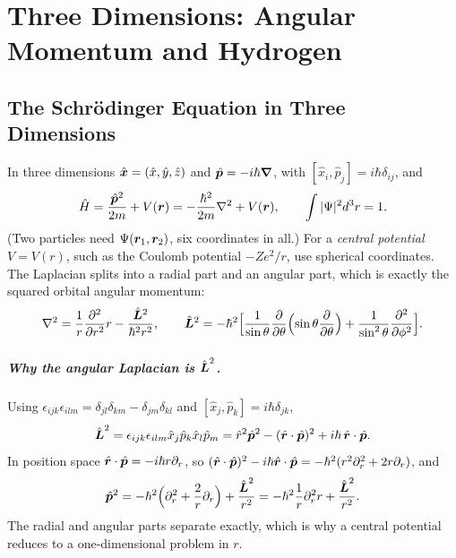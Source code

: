 \chapter{Three Dimensions: Angular Momentum and Hydrogen}
\label{ch:3d}

\section{The Schr\"odinger Equation in Three Dimensions}

In three dimensions $\hat{\bm{x}} = (\hat{x},\hat{y},\hat{z})$ and $\hat{\bm{p}} = -i\hbar\grad$, with $[\hat{x}_i,\hat{p}_j] = i\hbar\delta_{ij}$, and
\[
    \hat{H} = \frac{\hat{\lvect{p}}^2}{2m} + V(\lvect{r}) = -\frac{\hbar^2}{2m}\laplacian + V(\lvect{r}),
    \qquad
    \int|\Psi|^2d^3r = 1 .
\]
(Two particles need $\Psi(\bm{r}_1,\bm{r}_2)$, six coordinates in all.) For a \emph{central potential} $V = V(r)$, such as the Coulomb potential $-Ze^2/r$, use spherical coordinates. The Laplacian splits into a radial part and an angular part, which is exactly the squared orbital angular momentum:
\[
    \laplacian = \frac1r\pdv[2]{r}r - \frac{\hat{\lvect{L}}^2}{\hbar^2r^2},
    \qquad
    \hat{\lvect{L}}^2 = -\hbar^2\Bigl[\frac{1}{\sin\theta}\pdv{\theta}\Bigl(\sin\theta\pdv{\theta}\Bigr) + \frac{1}{\sin^2\theta}\pdv[2]{\phi}\Bigr].
\]

\paragraph{Why the angular Laplacian is $\hat{\vect{L}}^2$.} Using $\epsilon_{ijk}\epsilon_{ilm} = \delta_{jl}\delta_{km} - \delta_{jm}\delta_{kl}$ and $[\hat{x}_j,\hat{p}_k] = i\hbar\delta_{jk}$,
\[
    \hat{\vect{L}}^2 = \epsilon_{ijk}\epsilon_{ilm}\hat{x}_j\hat{p}_k\hat{x}_l\hat{p}_m = \hat{r}^2\hat{\lvect{p}}^2 - (\hat{\lvect{r}}\cdot\hat{\lvect{p}})^2 + i\hbar\,\hat{\lvect{r}}\cdot\hat{\lvect{p}} .
\]
In position space $\hat{\bm{r}}\cdot\hat{\bm{p}} = -i\hbar r\partial_r$, so $(\hat{\bm{r}}\cdot\hat{\bm{p}})^2 - i\hbar\hat{\bm{r}}\cdot\hat{\bm{p}} = -\hbar^2(r^2\partial_r^2 + 2r\partial_r)$, and
\[
    \hat{\lvect{p}}^2 = -\hbar^2\Bigl(\partial_r^2 + \frac2r\partial_r\Bigr) + \frac{\hat{\vect{L}}^2}{r^2} = -\hbar^2\frac1r\partial_r^2r + \frac{\hat{\vect{L}}^2}{r^2}.
\]
The radial and angular parts separate exactly, which is why a central potential reduces to a one-dimensional problem in $r$.

